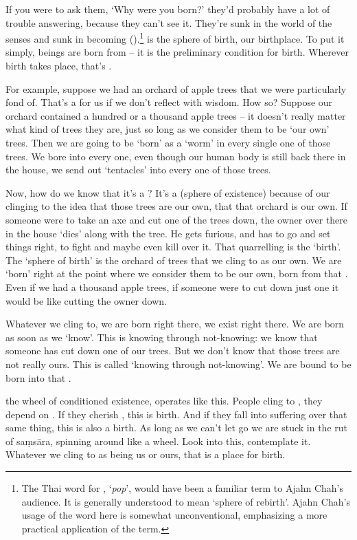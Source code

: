If you were to ask them, `Why were you born?' they'd probably have a lot of trouble answering, because they can't see it. They're sunk in the world of the senses and sunk in becoming ().\footnote{The Thai word for , `\textit{pop}', would have been a familiar term to Ajahn Chah's audience. It is generally understood to mean `sphere of rebirth'. Ajahn Chah's usage of the word here is somewhat unconventional, emphasizing a more practical application of the term.}  is the sphere of birth, our birthplace. To put it simply, beings are born from  -- it is the preliminary condition for birth. Wherever birth takes place, that's .

For example, suppose we had an orchard of apple trees that we were particularly fond of. That's a  for us if we don't reflect with wisdom. How so? Suppose our orchard contained a hundred or a thousand apple trees -- it doesn't really matter what kind of trees they are, just so long as we consider them to be `our own' trees. Then we are going to be `born' as a `worm' in every single one of those trees. We bore into every one, even though our human body is still back there in the house, we send out `tentacles' into every one of those trees.

Now, how do we know that it's a ? It's a  (sphere of existence) because of our clinging to the idea that those trees are our own, that that orchard is our own. If someone were to take an axe and cut one of the trees down, the owner over there in the house `dies' along with the tree. He gets furious, and has to go and set things right, to fight and maybe even kill over it. That quarrelling is the `birth'. The `sphere of birth' is the orchard of trees that we cling to as our own. We are `born' right at the point where we consider them to be our own, born from that . Even if we had a thousand apple trees, if someone were to cut down just one it would be like cutting the owner down.

Whatever we cling to, we are born right there, we exist right there. We are born as soon as we `know'. This is knowing through not-knowing: we know that someone has cut down one of our trees. But we don't know that those trees are not really ours. This is called `knowing through not-knowing'. We are bound to be born into that .

 the wheel of conditioned existence, operates like this. People cling to , they depend on . If they cherish , this is birth. And if they fall into suffering over that same thing, this is also a birth. As long as we can't let go we are stuck in the rut of sa\d{m}s\=ara, spinning around like a wheel. Look into this, contemplate it. Whatever we cling to as being us or ours, that is a place for birth.

